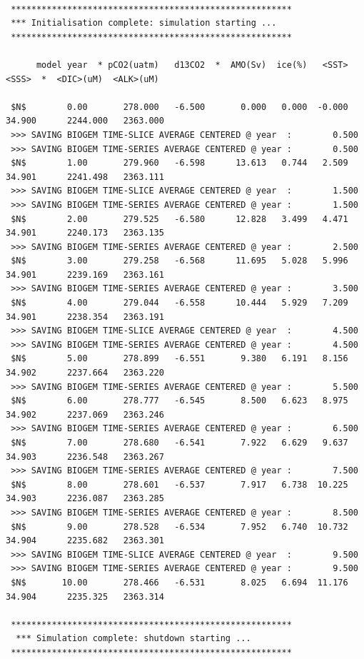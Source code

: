 \documentclass[11pt,fleqn]{book} %
\begin{document}
\footnotesize
\begin{verbatim}

 *******************************************************
 *** Initialisation complete: simulation starting ...
 *******************************************************
    
      model year  * pCO2(uatm)   d13CO2  *  AMO(Sv)  ice(%)   <SST>   <SSS>  *  <DIC>(uM)  <ALK>(uM)
  
 $N$        0.00       278.000   -6.500       0.000   0.000  -0.000  34.900      2244.000   2363.000
 >>> SAVING BIOGEM TIME-SLICE AVERAGE CENTERED @ year  :        0.500
 >>> SAVING BIOGEM TIME-SERIES AVERAGE CENTERED @ year :        0.500
 $N$        1.00       279.960   -6.598      13.613   0.744   2.509  34.901      2241.498   2363.111
 >>> SAVING BIOGEM TIME-SLICE AVERAGE CENTERED @ year  :        1.500
 >>> SAVING BIOGEM TIME-SERIES AVERAGE CENTERED @ year :        1.500
 $N$        2.00       279.525   -6.580      12.828   3.499   4.471  34.901      2240.173   2363.135
 >>> SAVING BIOGEM TIME-SERIES AVERAGE CENTERED @ year :        2.500
 $N$        3.00       279.258   -6.568      11.695   5.028   5.996  34.901      2239.169   2363.161
 >>> SAVING BIOGEM TIME-SERIES AVERAGE CENTERED @ year :        3.500
 $N$        4.00       279.044   -6.558      10.444   5.929   7.209  34.901      2238.354   2363.191
 >>> SAVING BIOGEM TIME-SLICE AVERAGE CENTERED @ year  :        4.500
 >>> SAVING BIOGEM TIME-SERIES AVERAGE CENTERED @ year :        4.500
 $N$        5.00       278.899   -6.551       9.380   6.191   8.156  34.902      2237.664   2363.220
 >>> SAVING BIOGEM TIME-SERIES AVERAGE CENTERED @ year :        5.500
 $N$        6.00       278.777   -6.545       8.500   6.623   8.975  34.902      2237.069   2363.246
 >>> SAVING BIOGEM TIME-SERIES AVERAGE CENTERED @ year :        6.500
 $N$        7.00       278.680   -6.541       7.922   6.629   9.637  34.903      2236.548   2363.267
 >>> SAVING BIOGEM TIME-SERIES AVERAGE CENTERED @ year :        7.500
 $N$        8.00       278.601   -6.537       7.917   6.738  10.225  34.903      2236.087   2363.285
 >>> SAVING BIOGEM TIME-SERIES AVERAGE CENTERED @ year :        8.500
 $N$        9.00       278.528   -6.534       7.952   6.740  10.732  34.904      2235.682   2363.301
 >>> SAVING BIOGEM TIME-SLICE AVERAGE CENTERED @ year  :        9.500
 >>> SAVING BIOGEM TIME-SERIES AVERAGE CENTERED @ year :        9.500
 $N$       10.00       278.466   -6.531       8.025   6.694  11.176  34.904      2235.325   2363.314

 *******************************************************
  *** Simulation complete: shutdown starting ...
 *******************************************************

\end{verbatim}
\normalsize
\end{document}
